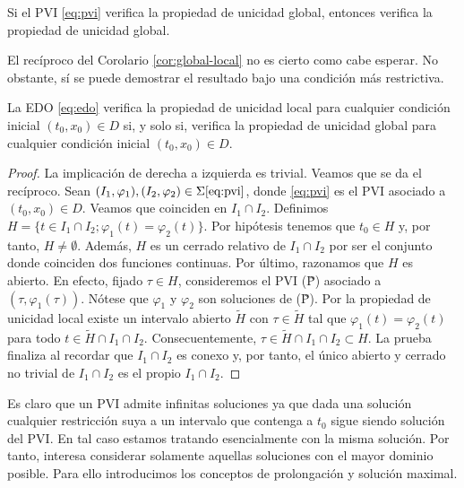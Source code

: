 \documentclass{article}
\begin{document}
\begin{corollary} \label{cor:global-local} Si el PVI \eqref{eq:pvi} verifica la propiedad de
  unicidad global, entonces verifica la propiedad de unicidad global.
\end{corollary}

El recíproco del Corolario \ref{cor:global-local} no es cierto como cabe esperar. No obstante, sí se
puede demostrar el resultado bajo una condición más restrictiva.

\begin{proposition} \label{prop:local-global} La EDO \eqref{eq:edo} verifica la propiedad de
  unicidad local para cualquier condición inicial $(t_0, x_0) \in D$ si, y solo si, verifica la
  propiedad de unicidad global para cualquier condición inicial $(t_0, x_0) \in D$.
\end{proposition}
\begin{proof}
  La implicación de derecha a izquierda es trivial. Veamos que se da el recíproco. Sean
  $(I_1, \varphi_1), (I_2, \varphi_2) \in \Sigma \eqref{eq:pvi}$, donde \eqref{eq:pvi} es el PVI
  asociado a $(t_0, x_0) \in D$. Veamos que coinciden en $I_1 \cap I_2$. Definimos
  $H = \{ t \in I_1 \cap I_2; \varphi_1(t) = \varphi_2(t)\}$. Por hipótesis tenemos que $t_0 \in H$
  y, por tanto, $H \neq \emptyset$. Además, $H$ es un cerrado relativo de $I_1 \cap I_2$ por ser el
  conjunto donde coinciden dos funciones continuas. Por último, razonamos que $H$ es abierto. En
  efecto, fijado $\tau \in H$, consideremos el PVI (\~P) asociado a $(\tau,
  \varphi_1(\tau))$. Nótese que $\varphi_1$ y $\varphi_2$ son soluciones de (\~P). Por la propiedad
  de unicidad local existe un intervalo abierto $\tilde{H}$ con $\tau \in \tilde{H}$ tal que
  $\varphi_1(t) = \varphi_2(t)$ para todo $t \in \tilde{H} \cap I_1 \cap I_2$.  Consecuentemente,
  $\tau \in \tilde{H} \cap I_1 \cap I_2 \subset H$. La prueba finaliza al recordar que
  $I_1 \cap I_2$ es conexo y, por tanto, el único abierto y cerrado no trivial de $I_1 \cap I_2$ es
  el propio $I_1 \cap I_2$.
\end{proof}

Es claro que un PVI admite infinitas soluciones ya que dada una solución cualquier restricción suya
a un intervalo que contenga a $t_0$ sigue siendo solución del PVI. En tal caso estamos tratando
esencialmente con la misma solución. Por tanto, interesa considerar solamente aquellas soluciones
con el mayor dominio posible. Para ello introducimos los conceptos de prolongación y solución
maximal.
\end{document}
